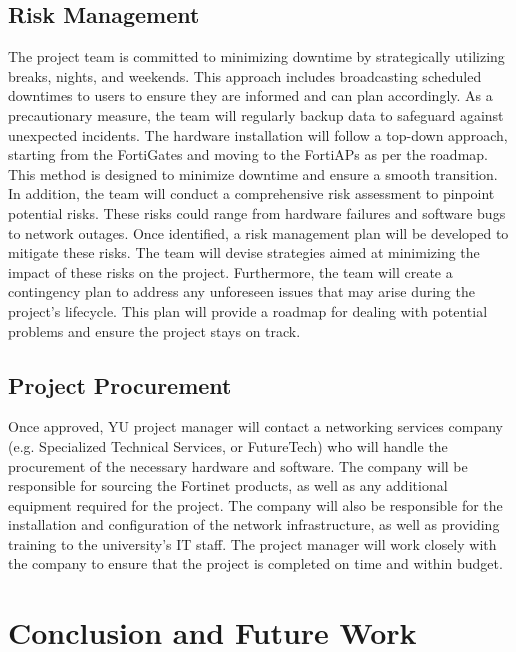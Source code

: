 \documentclass[12pt]{report}
\begin{document}
\section{Risk Management}
The project team is committed to minimizing downtime by strategically utilizing breaks, nights, and weekends. This approach includes broadcasting scheduled downtimes to users to ensure they are informed and can plan accordingly. As a precautionary measure, the team will regularly backup data to safeguard against unexpected incidents. The hardware installation will follow a top-down approach, starting from the FortiGates and moving to the FortiAPs as per the roadmap. This method is designed to minimize downtime and ensure a smooth transition. In addition, the team will conduct a comprehensive risk assessment to pinpoint potential risks. These risks could range from hardware failures and software bugs to network outages. Once identified, a risk management plan will be developed to mitigate these risks. The team will devise strategies aimed at minimizing the impact of these risks on the project. Furthermore, the team will create a contingency plan to address any unforeseen issues that may arise during the project's lifecycle. This plan will provide a roadmap for dealing with potential problems and ensure the project stays on track.
\section{Project Procurement}
Once approved, YU project manager will contact a networking services company (e.g. Specialized Technical Services, or FutureTech) who will handle the procurement of the necessary hardware and software. The company will be responsible for sourcing the Fortinet products, as well as any additional equipment required for the project. The company will also be responsible for the installation and configuration of the network infrastructure, as well as providing training to the university's IT staff. The project manager will work closely with the company to ensure that the project is completed on time and within budget.

\chapter{Conclusion and Future Work}
\end{document}
